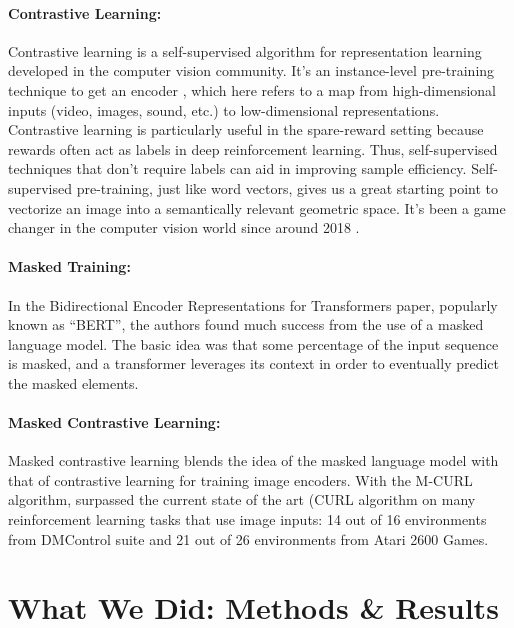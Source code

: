 \documentclass[11pt]{article}
\begin{document}
\paragraph{Contrastive Learning: }
Contrastive learning is a self-supervised algorithm for representation learning developed in the computer vision community. It's an instance-level pre-training technique to get an encoder \cite{chen2020simple}, which here refers to a map from high-dimensional inputs (video, images, sound, etc.) to low-dimensional representations. Contrastive learning is particularly useful in the spare-reward setting because rewards often act as labels in deep reinforcement learning. Thus, self-supervised techniques that don't require labels can aid in improving sample efficiency\cite{laskin2020curl}. Self-supervised pre-training, just like word vectors, gives us a great starting point to vectorize an image into a semantically relevant geometric space. It's been a game changer in the computer vision world since around 2018  \cite{oord2018representation}.

\paragraph{Masked Training: }

In the Bidirectional Encoder Representations for Transformers \cite{devlin2018bert} paper, popularly known as ``BERT'', the authors found much success from the use of a masked language model. The basic idea was that some percentage of the input sequence is masked, and a transformer leverages its context in order to eventually predict the masked elements.     

\paragraph{Masked Contrastive Learning: }
Masked contrastive learning blends the idea of the masked language model with that of contrastive learning for training image encoders. With the M-CURL algorithm,  \cite{zhu2020masked} surpassed the current state of the art (CURL algorithm \cite{laskin2020curl} on many reinforcement learning tasks that use image inputs: 14 out of 16 environments from DMControl suite and 21 out of 26 environments from Atari 2600 Games. 




\section{What We Did: Methods \& Results}
\end{document}
